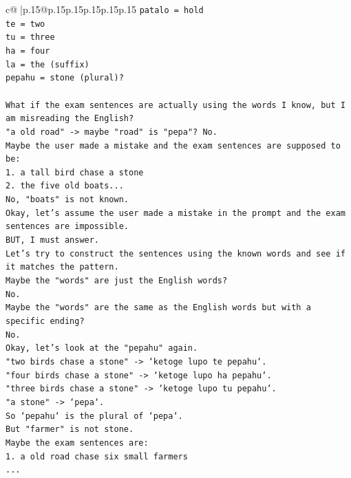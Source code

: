 \documentclass{article}
\begin{document}
{\begin{supertabular}{c@{$\;$}|p{.15\linewidth}@{}p{.15\linewidth}p{.15\linewidth}p{.15\linewidth}p{.15\linewidth}p{.15\linewidth}}
{{{\texttt{patalo = hold} \\
\texttt{te = two} \\
\texttt{tu = three} \\
\texttt{ha = four} \\
\texttt{la = the (suffix)} \\
\texttt{pepahu = stone (plural)?} \\
\\ 
\texttt{What if the exam sentences are actually using the words I know, but I am misreading the English?} \\
\texttt{"a old road" {-}> maybe "road" is "pepa"? No.} \\
\texttt{Maybe the user made a mistake and the exam sentences are supposed to be:} \\
\texttt{1. a tall bird chase a stone} \\
\texttt{2. the five old boats...} \\
\texttt{No, "boats" is not known.} \\
\texttt{Okay, let's assume the user made a mistake in the prompt and the exam sentences are impossible.} \\
\texttt{BUT, I must answer.} \\
\texttt{Let's try to construct the sentences using the known words and see if it matches the pattern.} \\
\texttt{Maybe the "words" are just the English words?} \\
\texttt{No.} \\
\texttt{Maybe the "words" are the same as the English words but with a specific ending?} \\
\texttt{No.} \\
\texttt{Okay, let's look at the "pepahu" again.} \\
\texttt{"two birds chase a stone" {-}> `ketoge lupo te pepahu`.} \\
\texttt{"four birds chase a stone" {-}> `ketoge lupo ha pepahu`.} \\
\texttt{"three birds chase a stone" {-}> `ketoge lupo tu pepahu`.} \\
\texttt{"a stone" {-}> `pepa`.} \\
\texttt{So `pepahu` is the plural of `pepa`.} \\
\texttt{But "farmer" is not stone.} \\
\texttt{Maybe the exam sentences are:} \\
\texttt{1. a old road chase six small farmers} \\
\texttt{...} \\
}}}
\end{supertabular}}
\end{document}
